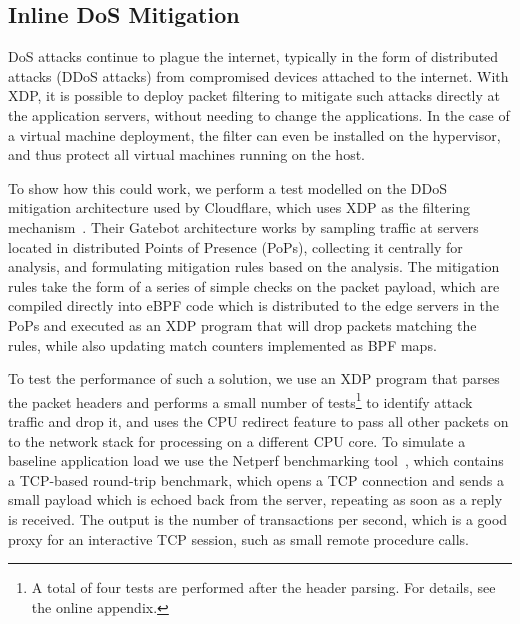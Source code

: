 \documentclass[10pt,sigconf]{acmart}
\begin{document}

\subsection{Inline DoS Mitigation}
\label{sec:dos-usecase}
DoS attacks continue to plague the internet, typically in the form of
distributed attacks (DDoS attacks) from compromised devices attached to the
internet. With XDP, it is possible to deploy packet filtering to mitigate such
attacks directly at the application servers, without needing to change the
applications. In the case of a virtual machine deployment, the filter can even
be installed on the hypervisor, and thus protect all virtual machines running on
the host.

To show how this could work, we perform a test modelled on the DDoS mitigation
architecture used by Cloudflare, which uses XDP as the filtering
mechanism~\cite{cloudflare-ddos}. Their Gatebot architecture works by sampling
traffic at servers located in distributed Points of Presence (PoPs), collecting
it centrally for analysis, and formulating mitigation rules based on the
analysis. The mitigation rules take the form of a series of simple checks on the
packet payload, which are compiled directly into eBPF code which is distributed
to the edge servers in the PoPs and executed as an XDP program that will drop
packets matching the rules, while also updating match counters implemented as
BPF maps.

To test the performance of such a solution, we use an XDP program that parses
the packet headers and performs a small number of tests\footnote{A total of four
  tests are performed after the header parsing. For details, see the online
  appendix.} to identify attack traffic and drop it, and uses the CPU redirect
feature to pass all other packets on to the network stack for processing on a
different CPU core. To simulate a baseline application load we use the Netperf
benchmarking tool~\cite{netperf}, which contains a TCP-based round-trip
benchmark, which opens a TCP connection and sends a small payload which is
echoed back from the server, repeating as soon as a reply is received. The
output is the number of transactions per second, which is a good proxy for an
interactive TCP session, such as small remote procedure calls.
\end{document}
